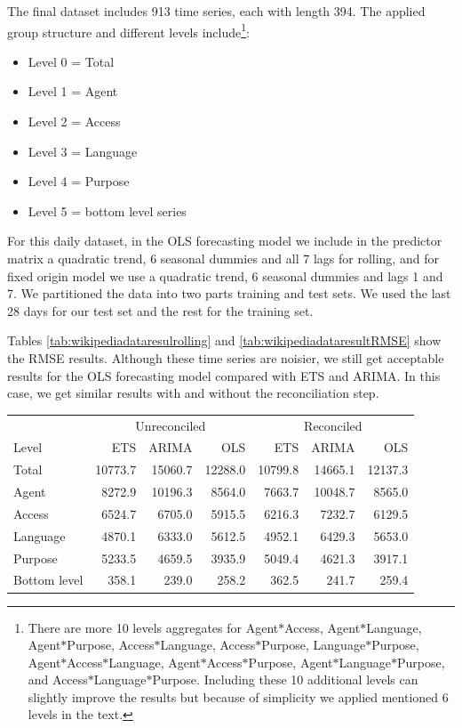 \documentclass[11pt,a4paper,]{article}
\providecommand{\tightlist}{%
  \setlength{\itemsep}{0pt}\setlength{\parskip}{0pt}}
\let\origtable\table
\let\endorigtable\endtable
\renewenvironment{table}[1][2] {
    \expandafter\origtable\expandafter[!htbp]
} {
    \endorigtable
}
\begin{document}
The final dataset includes 913 time series, each with length 394. The
applied group structure and different levels include\footnote{There are
  more 10 levels aggregates for Agent\(*\)Access, Agent\(*\)Language,
  Agent\(*\)Purpose, Access\(*\)Language, Access\(*\)Purpose,
  Language\(*\)Purpose, Agent\(*\)Access\(*\)Language,
  Agent\(*\)Access\(*\)Purpose, Agent\(*\)Language\(*\)Purpose, and
  Access\(*\)Language\(*\)Purpose. Including these 10 additional levels
  can slightly improve the results but because of simplicity we applied
  mentioned 6 levels in the text.}:

\begin{itemize}
\tightlist
\item
  Level 0 = Total
\item
  Level 1 = Agent
\item
  Level 2 = Access
\item
  Level 3 = Language
\item
  Level 4 = Purpose
\item
  Level 5 = bottom level series
\end{itemize}

For this daily dataset, in the OLS forecasting model we include in the
predictor matrix a quadratic trend, 6 seasonal dummies and all 7 lags
for rolling, and for fixed origin model we use a quadratic trend, 6
seasonal dummies and lags 1 and 7. We partitioned the data into two
parts training and test sets. We used the last 28 days for our test set
and the rest for the training set.

Tables \ref{tab:wikipediadataresulrolling} and
\ref{tab:wikipediadataresultRMSE} show the RMSE results. Although these
time series are noisier, we still get acceptable results for the OLS
forecasting model compared with ETS and ARIMA. In this case, we get
similar results with and without the reconciliation step.

\begin{table}[!h]

\caption{\label{tab:wikipediadataresulrolling}Mean(RMSE) for ETS, ARIMA and OLS with and without reconciliation - Rolling origin - Wikipedia dataset}
\centering
\begin{tabular}{lrrrrrr}
\toprule
\multicolumn{1}{c}{} & \multicolumn{3}{c}{Unreconciled} & \multicolumn{3}{c}{Reconciled} \\
\cmidrule(l{2pt}r{2pt}){2-4} \cmidrule(l{2pt}r{2pt}){5-7}
Level & ETS & ARIMA & OLS & ETS & ARIMA & OLS\\
\midrule
Total & 10773.7 & 15060.7 & 12288.0 & 10799.8 & 14665.1 & 12137.3\\
Agent & 8272.9 & 10196.3 & 8564.0 & 7663.7 & 10048.7 & 8565.0\\
Access & 6524.7 & 6705.0 & 5915.5 & 6216.3 & 7232.7 & 6129.5\\
Language & 4870.1 & 6333.0 & 5612.5 & 4952.1 & 6429.3 & 5653.0\\
Purpose & 5233.5 & 4659.5 & 3935.9 & 5049.4 & 4621.3 & 3917.1\\
Bottom level & 358.1 & 239.0 & 258.2 & 362.5 & 241.7 & 259.4\\
\bottomrule
\end{tabular}
\end{table}
\end{document}
